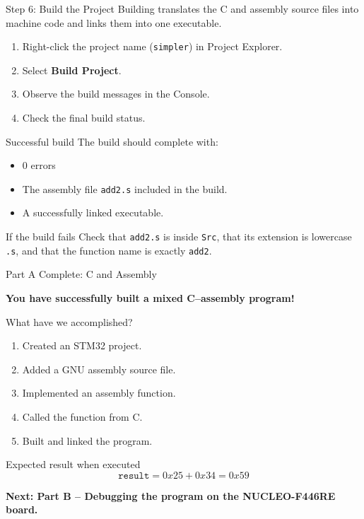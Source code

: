 \documentclass[9pt,aspectratio=169,xcolor=table]{beamer}
\begin{document}
\begin{frame}{Step 6: Build the Project}
	Building translates the C and assembly source files into
	machine code and links them into one executable.

	\begin{enumerate}
		\item Right-click the project name (\texttt{simpler})
		in Project Explorer.
		\item Select \textbf{Build Project}.
		\item Observe the build messages in the Console.
		\item Check the final build status.
	\end{enumerate}

	\begin{block}{Successful build}
		The build should complete with:
		\begin{itemize}
			\item 0 errors
			\item The assembly file \texttt{add2.s} included
			in the build.
			\item A successfully linked executable.
		\end{itemize}
	\end{block}

	\begin{alertblock}{If the build fails}
		Check that \texttt{add2.s} is inside \texttt{Src},
		that its extension is lowercase \texttt{.s}, and
		that the function name is exactly \texttt{add2}.
	\end{alertblock}
\end{frame}


\begin{frame}{Part A Complete: C and Assembly}
	\begin{center}
		\Large\textbf{You have successfully built a mixed
			C--assembly program!}
	\end{center}

	\vspace{3mm}

	\begin{block}{What have we accomplished?}
		\begin{enumerate}
			\item Created an STM32 project.
			\item Added a GNU assembly source file.
			\item Implemented an assembly function.
			\item Called the function from C.
			\item Built and linked the program.
		\end{enumerate}
	\end{block}

	\begin{exampleblock}{Expected result when executed}
		\[
		\texttt{result} = 0x25 + 0x34 = 0x59
		\]
	\end{exampleblock}

	\textbf{Next: Part B -- Debugging the program on the
		NUCLEO-F446RE board.}
\end{frame}
\end{document}
